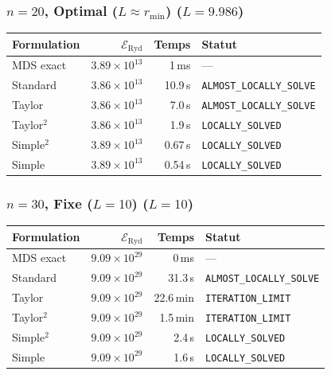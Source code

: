 \subsubsection{$n=20$, Optimal ($L{\approx}r_{\min}$) ($L=9.986$)}
\begin{longtable}{@{}lrrl@{}}
  \toprule
  Formulation & $\mathcal{E}_{\mathrm{Ryd}}$ & Temps & Statut \\
  \midrule
  \endhead
  MDS exact & $3.89\times10^{13}$ & 1\,ms & --- \\
  Standard & $3.86\times10^{13}$ & 10.9\,s & \texttt{ALMOST\_LOCALLY\_SOLVE} \\
  Taylor & $3.86\times10^{13}$ & 7.0\,s & \texttt{ALMOST\_LOCALLY\_SOLVE} \\
  Taylor$^2$ & $3.86\times10^{13}$ & 1.9\,s & \texttt{LOCALLY\_SOLVED} \\
  Simple$^2$ & $3.89\times10^{13}$ & 0.67\,s & \texttt{LOCALLY\_SOLVED} \\
  Simple & $3.89\times10^{13}$ & 0.54\,s & \texttt{LOCALLY\_SOLVED} \\
  \bottomrule
\end{longtable}

\subsubsection{$n=30$, Fixe ($L{=}10$) ($L=10$)}
\begin{longtable}{@{}lrrl@{}}
  \toprule
  Formulation & $\mathcal{E}_{\mathrm{Ryd}}$ & Temps & Statut \\
  \midrule
  \endhead
  MDS exact & $9.09\times10^{29}$ & 0\,ms & --- \\
  Standard & $9.09\times10^{29}$ & 31.3\,s & \texttt{ALMOST\_LOCALLY\_SOLVE} \\
  Taylor & $9.09\times10^{29}$ & 22.6\,min & \texttt{ITERATION\_LIMIT} \\
  Taylor$^2$ & $9.09\times10^{29}$ & 1.5\,min & \texttt{ITERATION\_LIMIT} \\
  Simple$^2$ & $9.09\times10^{29}$ & 2.4\,s & \texttt{LOCALLY\_SOLVED} \\
  Simple & $9.09\times10^{29}$ & 1.6\,s & \texttt{LOCALLY\_SOLVED} \\
  \bottomrule
\end{longtable}

